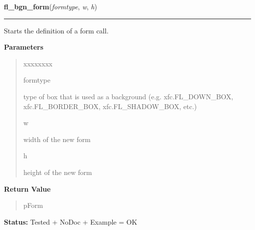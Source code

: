     \label{xformslib:library:fl_bgn_form}

    \vspace{0.5ex}

\hspace{.8\funcindent}\begin{boxedminipage}{\funcwidth}

    \raggedright \textbf{fl\_bgn\_form}(\textit{formtype}, \textit{w}, \textit{h})

    \vspace{-1.5ex}

    \rule{\textwidth}{0.5\fboxrule}
\setlength{\parskip}{2ex}
    Starts the definition of a form call.

\setlength{\parskip}{1ex}
      \textbf{Parameters}
      \vspace{-1ex}

      \begin{quote}
        \begin{Ventry}{xxxxxxxx}

          \item[formtype]

          type of box that is used as a background (e.g. xfc.FL\_DOWN\_BOX,
          xfc.FL\_BORDER\_BOX, xfc.FL\_SHADOW\_BOX, etc.)

          \item[w]

          width of the new form

          \item[h]

          height of the new form

        \end{Ventry}

      \end{quote}

      \textbf{Return Value}
    \vspace{-1ex}

      \begin{quote}
      pForm

      \end{quote}

\textbf{Status:} Tested + NoDoc + Example = OK



    \end{boxedminipage}

    \label{xformslib:library:fl_end_form}

